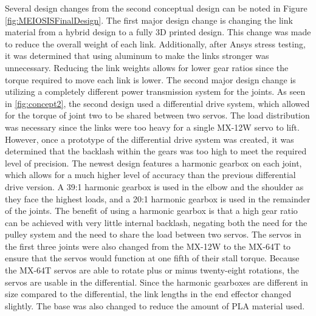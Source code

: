 Several design changes from the second conceptual design can be noted in Figure \ref{fig:MEIOSISFinalDesign}. The first major design change is changing the link material from a hybrid design to a fully 3D printed design. This change was made to reduce the overall weight of each link. Additionally, after Ansys stress testing, it was determined that using aluminum to make the links stronger was unnecessary. Reducing the link weights allows for lower gear ratios since the torque required to move each link is lower. The second major design change is utilizing a completely different power transmission system for the joints. As seen in \ref{fig:concept2}, the second design used a differential drive system, which allowed for the torque of joint two to be shared between two servos. The load distribution was necessary since the links were too heavy for a single MX-12W servo to lift. However, once a prototype of the differential drive system was created, it was determined that the backlash within the gears was too high to meet the required level of precision. The newest design features a harmonic gearbox on each joint, which allows for a much higher level of accuracy than the previous differential drive version. A 39:1 harmonic gearbox is used in the elbow and the shoulder as they face the highest loads, and a 20:1 harmonic gearbox is used in the remainder of the joints. The benefit of using a harmonic gearbox is that a high gear ratio can be achieved with very little internal backlash, negating both the need for the pulley system and the need to share the load between two servos. The servos in the first three joints were also changed from the MX-12W to the MX-64T to ensure that the servos would function at one fifth of their stall torque. Because the MX-64T servos are able to rotate plus or minus twenty-eight rotations, the servos are usable in the differential. Since the harmonic gearboxes are different in size compared to the differential, the link lengths in the end effector changed slightly. The base was also changed to reduce the amount of PLA material used.
